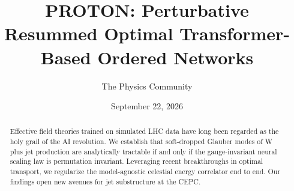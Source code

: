 \documentclass[11pt]{article}
\title{PROTON: Perturbative Resummed Optimal Transformer-Based Ordered Networks}
\author{The Physics Community}
\date{September 22, 2026}
\numberwithin{equation}{section}
\theoremstyle{definition}
\theoremstyle{remark}
\begin{document}
\maketitle
\begin{abstract}
Effective field theories trained on simulated LHC data have long been
regarded as the holy grail of the AI revolution. We establish that
soft-dropped Glauber modes of W plus jet production are analytically
tractable if and only if the gauge-invariant neural scaling law is
permutation invariant. Leveraging recent breakthroughs in optimal
transport, we regularize the model-agnostic celestial energy correlator
end to end. Our findings open new avenues for jet substructure at the
CEPC.
\end{abstract}
\tableofcontents






\nocite{*}


\end{document}
